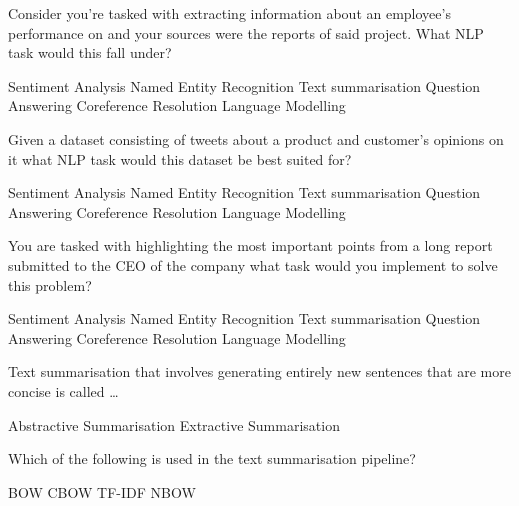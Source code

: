 \documentclass[theme=sleek, randomorder, hidesidemenu]{webquiz}
\begin{document}
\begin{question}
  Consider you're tasked with extracting information about an employee's performance on and your sources were the reports of said project. What NLP task would this fall under?
  \begin{choice}
    \incorrect Sentiment Analysis
    \correct Named Entity Recognition
    \incorrect Text summarisation
    \incorrect Question Answering
    \incorrect Coreference Resolution
    \incorrect Language Modelling
  \end{choice}
\end{question}

\begin{question}
  Given a dataset consisting of tweets about a product and customer's opinions on it what NLP task would this dataset be best suited for?
  \begin{choice}
    \correct Sentiment Analysis
    \incorrect Named Entity Recognition
    \incorrect Text summarisation
    \incorrect Question Answering
    \incorrect Coreference Resolution
    \incorrect Language Modelling
  \end{choice}
\end{question}

\begin{question}
  You are tasked with highlighting the most important points from a long report submitted to the CEO of the company what task would you implement to solve this problem?
  \begin{choice}
    \incorrect Sentiment Analysis
    \incorrect Named Entity Recognition
    \correct Text summarisation
    \incorrect Question Answering
    \incorrect Coreference Resolution
    \incorrect Language Modelling
  \end{choice}
\end{question}

\begin{question}
  Text summarisation that involves generating entirely new sentences that are more concise is called \ldots
  \begin{choice}
    \correct Abstractive Summarisation
    \incorrect Extractive Summarisation
  \end{choice}
\end{question}

\begin{question}
  Which of the following is used in the text summarisation pipeline?
  \begin{choice}
    \incorrect BOW
    \incorrect CBOW
    \correct TF-IDF
    \incorrect NBOW
  \end{choice}
\end{question}
\end{document}
